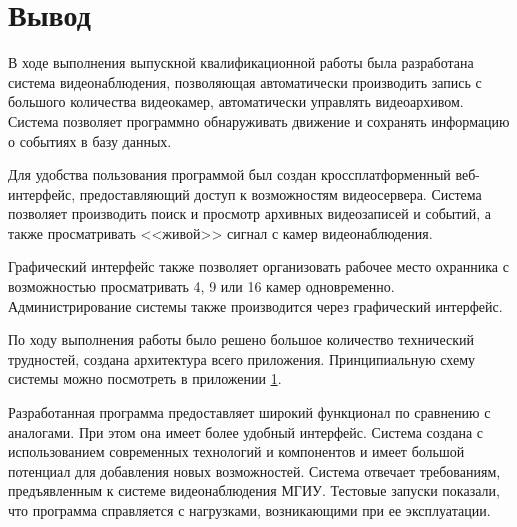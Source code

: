\chapter*{Вывод}

В ходе выполнения выпускной квалификационной работы была
разработана система видеонаблюдения, позволяющая
автоматически производить запись с большого количества видеокамер,
автоматически управлять видеоархивом.
Система позволяет программно обнаруживать движение и сохранять информацию
о событиях в базу данных.

Для удобства пользования программой был создан кроссплатформенный веб-интерфейс,
предоставляющий доступ к возможностям видеосервера. Система позволяет производить поиск
и просмотр архивных видеозаписей и событий, а также просматривать <<живой>> сигнал с камер
видеонаблюдения.

Графический интерфейс также позволяет организовать рабочее место охранника с возможностью
просматривать 4, 9 или 16 камер одновременно. Администрирование системы также производится
через графический интерфейс.

По ходу выполнения работы было решено большое количество технический трудностей,
создана архитектура всего приложения. Принципиальную схему системы можно посмотреть в приложении \hyperlink{scheme.1}{1}.

Разработанная программа предоставляет широкий функционал по сравнению с аналогами. При этом она имеет
более удобный интерфейс. Система создана с использованием современных технологий и компонентов и имеет большой потенциал для добавления новых возможностей. Система отвечает требованиям, предъявленным к
системе видеонаблюдения МГИУ. Тестовые запуски показали, что программа справляется с нагрузками,
возникающими при ее эксплуатации.
